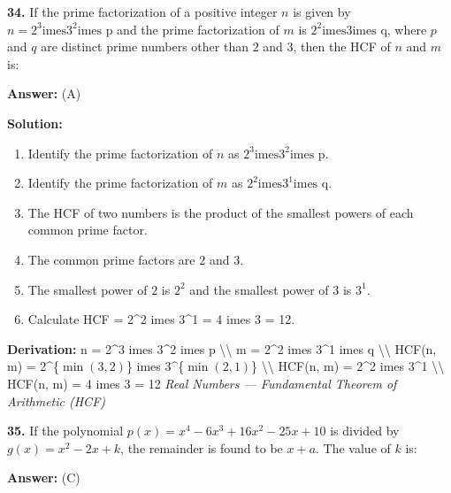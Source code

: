 \documentclass[12pt,a4paper]{exam}
\begin{document}
\begin{questions}
\question \textbf{34.} If the prime factorization of a positive integer $n$ is given by $n = 2^3 \text{imes} 3^2 \text{imes p}$ and the prime factorization of $m$ is $2^2 \text{imes} 3 \text{imes q}$, where $p$ and $q$ are distinct prime numbers other than $2$ and $3$, then the HCF of $n$ and $m$ is:

\textbf{Answer:}
(A)

\textbf{Solution:}
\begin{enumerate}
  \item Identify the prime factorization of $n$ as $2^3 \text{imes} 3^2 \text{imes p}$.
  \item Identify the prime factorization of $m$ as $2^2 \text{imes} 3^1 \text{imes q}$.
  \item The HCF of two numbers is the product of the smallest powers of each common prime factor.
  \item The common prime factors are $2$ and $3$.
  \item The smallest power of $2$ is $2^2$ and the smallest power of $3$ is $3^1$.
  \item Calculate HCF = 2\textasciicircum{}2 	imes 3\textasciicircum{}1 = 4 	imes 3 = 12.
\end{enumerate}
\textbf{Derivation:}
 n = 2\textasciicircum{}3 	imes 3\textasciicircum{}2 	imes p \textbackslash{}\textbackslash{} m = 2\textasciicircum{}2 	imes 3\textasciicircum{}1 	imes q \textbackslash{}\textbackslash{} HCF(n, m) = 2\textasciicircum{}\{$\min(3, 2)$\} 	imes 3\textasciicircum{}\{$\min(2, 1)$\} \textbackslash{}\textbackslash{} HCF(n, m) = 2\textasciicircum{}2 	imes 3\textasciicircum{}1 \textbackslash{}\textbackslash{} HCF(n, m) = 4 	imes 3 = 12 
\hfill \textit{Real Numbers — Fundamental Theorem of Arithmetic (HCF)}
\vspace{0.3cm}

\question \textbf{35.} If the polynomial $p(x) = x^4 - 6x^3 + 16x^2 - 25x + 10$ is divided by $g(x) = x^2 - 2x + k$, the remainder is found to be $x + a$. The value of $k$ is:

\textbf{Answer:}
(C)


\end{questions}
\end{document}
